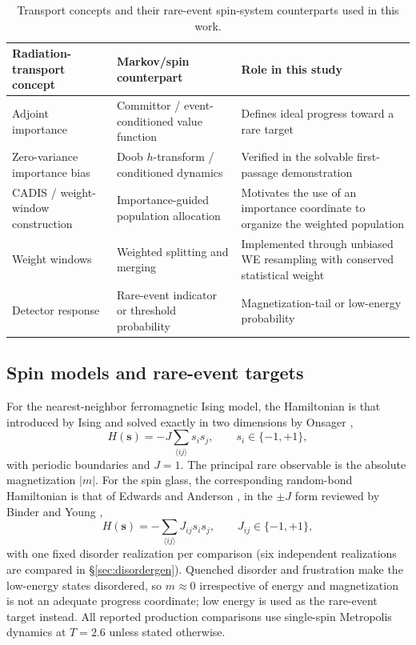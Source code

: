 \documentclass[a4paper,fleqn]{cas-sc}
\begin{document}
\begin{table}[H]
\centering\small
\caption{Transport concepts and their rare-event spin-system counterparts used in this work.}
\label{tab:map}
\begin{tabular}{p{}p{}p{}}
\toprule
Radiation-transport concept & Markov/spin counterpart & Role in this study \\
\midrule
Adjoint importance & Committor / event-conditioned value function & Defines ideal progress
toward a rare target \\
Zero-variance importance bias & Doob $h$-transform / conditioned dynamics & Verified in the
solvable first-passage demonstration \\
CADIS / weight-window construction & Importance-guided population allocation & Motivates the
use of an importance coordinate to organize the weighted population \\
Weight windows & Weighted splitting and merging & Implemented through unbiased WE resampling
with conserved statistical weight \\
Detector response & Rare-event indicator or threshold probability & Magnetization-tail or
low-energy probability \\
\bottomrule
\end{tabular}
\end{table}

\subsection{Spin models and rare-event targets}\label{sec:models}
For the nearest-neighbor ferromagnetic Ising model, the Hamiltonian is that introduced by
Ising \citep{ising1925} and solved exactly in two dimensions by Onsager \citep{onsager1944},
\begin{equation}
H(\mathbf s)=-J\sum_{\langle ij\rangle}s_is_j,\qquad s_i\in\{-1,+1\},
\label{eq:ising}
\end{equation}
with periodic boundaries and $J=1$. The principal rare observable is the absolute
magnetization $|m|$. For the spin glass, the corresponding random-bond Hamiltonian is that of
Edwards and Anderson \citep{edwards1975}, in the $\pm J$ form reviewed by Binder and Young
\citep{binder1986},
\begin{equation}
H(\mathbf s)=-\sum_{\langle ij\rangle}J_{ij}s_is_j,\qquad J_{ij}\in\{-1,+1\},
\label{eq:ea}
\end{equation}
with one fixed disorder realization per comparison (six independent realizations are
compared in \S\ref{sec:disordergen}). Quenched disorder and frustration make the low-energy
states disordered, so $m\approx0$ irrespective of energy and magnetization is not an adequate
progress coordinate; low energy is used as the rare-event target instead. All reported
production comparisons use single-spin Metropolis dynamics \citep{metropolis1953} at $T=2.6$
unless stated otherwise.
\end{document}
